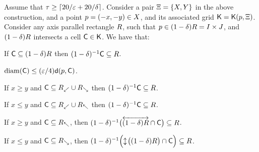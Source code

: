 \documentclass[12pt]{article}%
\begin{document}
\begin{lemma}
    Assume that $\tau \geq \left\lceil {20/\varepsilon+ 20/\delta} \right\rceil$.  Consider a
    pair $\Xi = \{X, Y \}$ in the above construction, and a
    point $p =(-x,-y) \in X$, and its associated grid
    $\mathsf{K} = \mathsf{K}(p, \Xi)$. Consider any axis
    parallel rectangle $R$, such that
    $p \in (1-\delta)R = I\times J$, and $(1-\delta)R$
    intersects a cell $\mathsf{C} \in \mathsf{K}$. We have that:
    \begin{compactenumI}
        \smallskip%
        \item {} If $\mathsf{C} \subseteq (1-\delta)R$ then
        $(1-\delta)^{-1} \mathsf{C} \subseteq R$.

        \item {}
        $\diameterX{\cell} \leq (\eps/4) \dsY{\pa}{\cell}$.

        \item {} If $x \geq y$ and
        $\mathsf{C} \subseteq R_\swarrow \cup R_\searrow$ then
        $(1-\delta)^{-1} \mathsf{C} \subseteq R$.

        \item {} If $x \leq y$ and
        $\mathsf{C} \subseteq R_\swarrow \cup R_\nwarrow$ then
        $(1-\delta)^{-1} \mathsf{C} \subseteq R$.

        \smallskip%
        \item {} If $x \geq y$ and
        $\mathsf{C} \subseteq R_\nwarrow$, then
        $(1-\delta)^{-1} \bigl(\overleftrightarrow{ (1-\delta)R} \cap \mathsf{C}
        \bigr) \subseteq R$.

        \smallskip%
        \item {} If $x \leq y$ and
        $\mathsf{C} \subseteq R_\searrow$, then
        $(1-\delta)^{-1} \Bigl(\updownarrow\!{\bigl( (1-\delta)R \bigr)}
        \cap \mathsf{C} \Bigr) \subseteq R$.
    \end{compactenumI}
\end{lemma}
\end{document}
